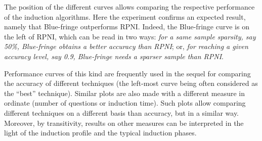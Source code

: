 The position of the different curves allows comparing the respective performance of the induction algorithms. Here the experiment confirms an expected result, namely that Blue-fringe outperforms RPNI. Indeed, the Blue-fringe curve is on the left of RPNI, which can be read in two ways: \emph{for a same sample sparsity, say 50\%, Blue-fringe obtains a better accuracy than RPNI}; or, \emph{for reaching a given accuracy level, say 0.9, Blue-fringe needs a sparser sample than RPNI}.

Performance curves of this kind are frequently used in the sequel for comparing the accuracy of different techniques (the left-most curve being often considered as the ``best'' technique). Similar plots are also made with a different measure in ordinate (number of questions or induction time). Such plots allow comparing different techniques on a different basis than accuracy, but in a similar way. Moreover, by transitivity, results on other measures can be interpreted in the light of the induction profile and the typical induction phases.

